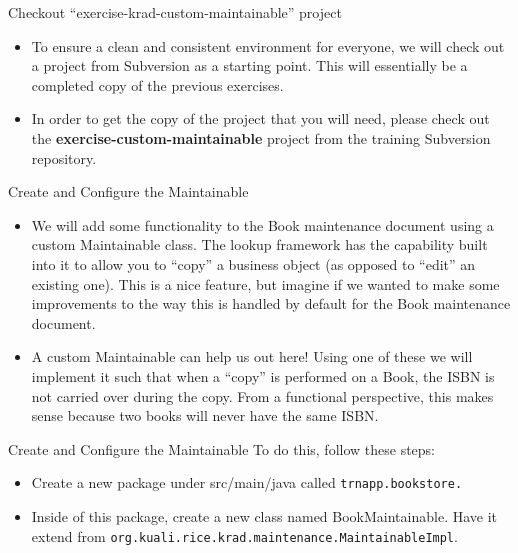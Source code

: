 \documentclass[xcolor=dvipsnames,14pt,professionalfonts]{beamer}
\begin{document}
\begin{frame}{Checkout “exercise-krad-custom-maintainable” project}
  \begin{itemize}
    \item To ensure a clean and consistent environment for everyone, we will check out a project from Subversion as a starting point.  This will essentially be a completed copy of the previous exercises.
    \item In order to get the copy of the project that you will need,
      please check out the \textbf{exercise-custom-maintainable} project from
      the training Subversion repository.
      \end{itemize}
    \end{frame}
    
    \begin{frame}{Create and Configure the Maintainable}
      \begin{itemize}
      \item We will add some functionality to the Book maintenance document using a custom Maintainable class.  The lookup framework has the capability built into it to allow you to “copy” a business object (as opposed to “edit” an existing one).  This is a nice feature, but imagine if we wanted to make some improvements to the way this is handled by default for the Book maintenance document.
      \item A custom Maintainable can help us out here!  Using one of
        these we will implement it such that when a “copy” is
        performed on a Book, the ISBN is not carried over during the
        copy.  From a functional perspective, this makes sense because
        two books will never have the same ISBN.
      \end{itemize}     
    \end{frame}

    \begin{frame}{Create and Configure the Maintainable}
 To do this, follow these steps:
      \begin{itemize}
      \item Create a new package under src/main/java called \texttt{trnapp.bookstore.}
      \item Inside of this package, create a new class named
        BookMaintainable.  Have it extend from
        \texttt{org.kuali.rice.krad.maintenance.MaintainableImpl}.
      \end{itemize}     
    \end{frame}
 
\end{document}
